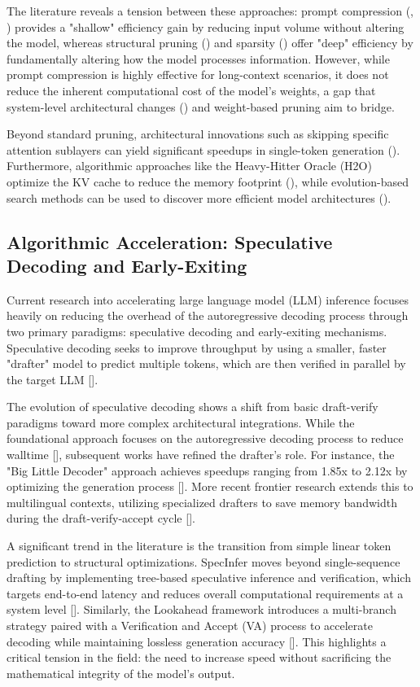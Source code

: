\documentclass[11pt]{article}
\begin{document}
The literature reveals a tension between these approaches: prompt compression (\citep{2310.05736}, \citep{2310.06201}) provides a "shallow" efficiency gain by reducing input volume without altering the model, whereas structural pruning (\citep{2305.11627}) and sparsity (\citep{2310.17157}) offer "deep" efficiency by fundamentally altering how the model processes information. However, while prompt compression is highly effective for long-context scenarios, it does not reduce the inherent computational cost of the model's weights, a gap that system-level architectural changes (\citep{2311.18677}) and weight-based pruning aim to bridge.

Beyond standard pruning, architectural innovations such as skipping specific attention sublayers can yield significant speedups in single-token generation (\citep{2404.05741}). Furthermore, algorithmic approaches like the Heavy-Hitter Oracle (H2O) optimize the KV cache to reduce the memory footprint (\citep{2306.14048}), while evolution-based search methods can be used to discover more efficient model architectures (\citep{2409.17372}).
\subsection{Algorithmic Acceleration: Speculative Decoding and Early-Exiting}

Current research into accelerating large language model (LLM) inference focuses heavily on reducing the overhead of the autoregressive decoding process through two primary paradigms: speculative decoding and early-exiting mechanisms. Speculative decoding seeks to improve throughput by using a smaller, faster "drafter" model to predict multiple tokens, which are then verified in parallel by the target LLM [\citep{2211.17192}].

The evolution of speculative decoding shows a shift from basic draft-verify paradigms toward more complex architectural integrations. While the foundational approach focuses on the autoregressive decoding process to reduce walltime [\citep{2211.17192}], subsequent works have refined the drafter's role. For instance, the "Big Little Decoder" approach achieves speedups ranging from 1.85x to 2.12x by optimizing the generation process [\citep{2302.07863}]. More recent frontier research extends this to multilingual contexts, utilizing specialized drafters to save memory bandwidth during the draft-verify-accept cycle [\citep{2406.16758}].

A significant trend in the literature is the transition from simple linear token prediction to structural optimizations. SpecInfer moves beyond single-sequence drafting by implementing tree-based speculative inference and verification, which targets end-to-end latency and reduces overall computational requirements at a system level [\citep{2305.09781}]. Similarly, the Lookahead framework introduces a multi-branch strategy paired with a Verification and Accept (VA) process to accelerate decoding while maintaining lossless generation accuracy [\citep{2312.12728}]. This highlights a critical tension in the field: the need to increase speed without sacrificing the mathematical integrity of the model's output.
\end{document}

